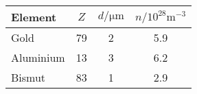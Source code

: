 \label{tab:tabZWerte}
	\begin{tabular}{lS[table-format=2.0]S[table-format=1.0]S[table-format=1.1]}
		\toprule
		{Element} & {$Z$} & {$d/\si{\micro\metre}$} & {$n/10^{28}\si{\metre^{-3}}$} \\
		\midrule
		{Gold} & 79 & 2 & 5.9  \\
		{Aluminium} & 13 & 3 & 6.2  \\
		{Bismut} & 83 & 1 & 2.9  \\
		\bottomrule
	\end{tabular}
